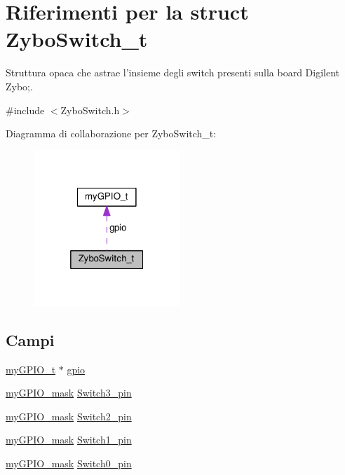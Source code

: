 \hypertarget{struct_zybo_switch__t}{\section{Riferimenti per la struct Zybo\+Switch\+\_\+t}
\label{struct_zybo_switch__t}
}


Struttura opaca che astrae l'insieme degli switch presenti sulla board Digilent Zybo;.  




{\ttfamily \#include $<$Zybo\+Switch.\+h$>$}



Diagramma di collaborazione per Zybo\+Switch\+\_\+t\+:\nopagebreak
\begin{figure}[H]
\begin{center}
\leavevmode
\includegraphics[width=157pt]{struct_zybo_switch__t__coll__graph}
\end{center}
\end{figure}
\subsection*{Campi}
\begin{DoxyCompactItemize}
\item 
\hyperlink{structmy_g_p_i_o__t}{my\+G\+P\+I\+O\+\_\+t} $\ast$ \hyperlink{struct_zybo_switch__t_ac37ddc7c58d246d233dfb38037020184}{gpio}
\item 
\hyperlink{group__bare-metal_ga402a0d20afc0cb7c25554b8b023f4253}{my\+G\+P\+I\+O\+\_\+mask} \hyperlink{struct_zybo_switch__t_ab2ea73dda75022931396b29e1c377cfb}{Switch3\+\_\+pin}
\item 
\hyperlink{group__bare-metal_ga402a0d20afc0cb7c25554b8b023f4253}{my\+G\+P\+I\+O\+\_\+mask} \hyperlink{struct_zybo_switch__t_aacdefa991c974546015032b1bb95ea1e}{Switch2\+\_\+pin}
\item 
\hyperlink{group__bare-metal_ga402a0d20afc0cb7c25554b8b023f4253}{my\+G\+P\+I\+O\+\_\+mask} \hyperlink{struct_zybo_switch__t_aa031241ea0c12a6f327d3697113e992c}{Switch1\+\_\+pin}
\item 
\hyperlink{group__bare-metal_ga402a0d20afc0cb7c25554b8b023f4253}{my\+G\+P\+I\+O\+\_\+mask} \hyperlink{struct_zybo_switch__t_aa125c82837d72bdb20a0e22f3a86646e}{Switch0\+\_\+pin}
\end{DoxyCompactItemize}


